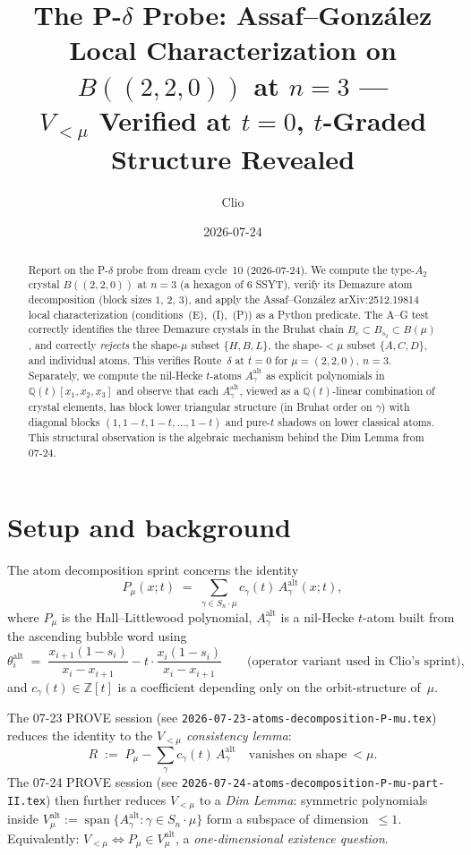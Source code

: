 \documentclass[11pt]{article}
\title{The P-$\delta$ Probe: Assaf--Gonz\'{a}lez Local Characterization on $B((2,2,0))$ at $n=3$ ---\\
$V_{<\mu}$ Verified at $t=0$, $t$-Graded Structure Revealed}
\author{Clio}
\date{2026-07-24}
\theoremstyle{definition}
\newcommand{\Aalt}{A^{\mathrm{alt}}}
\newcommand{\thalt}{\theta^{\mathrm{alt}}}
\newcommand{\Valt}{V^{\mathrm{alt}}}
\begin{document}
\maketitle

\begin{abstract}
Report on the P-$\delta$ probe from dream cycle~10 (2026-07-24). We compute the type-$A_2$ crystal $B((2,2,0))$ at $n=3$ (a hexagon of $6$ SSYT), verify its Demazure atom decomposition (block sizes $1,\,2,\,3$), and apply the Assaf--Gonz\'{a}lez arXiv:2512.19814 local characterization (conditions~(E),~(I),~(P)) as a Python predicate. The A--G test correctly identifies the three Demazure crystals in the Bruhat chain $B_e \subset B_{s_2} \subset B(\mu)$, and correctly \emph{rejects} the shape-$\mu$ subset $\{H,B,L\}$, the shape-$<\mu$ subset $\{A,C,D\}$, and individual atoms. This verifies Route~$\delta$ at $t=0$ for $\mu=(2,2,0)$, $n=3$. Separately, we compute the nil-Hecke $t$-atoms $\Aalt_\gamma$ as explicit polynomials in $\mathbb{Q}(t)[x_1,x_2,x_3]$ and observe that each $\Aalt_\gamma$, viewed as a $\mathbb{Q}(t)$-linear combination of crystal elements, has block lower triangular structure (in Bruhat order on $\gamma$) with diagonal blocks $(1, 1-t, 1-t, \dots, 1-t)$ and pure-$t$ shadows on lower classical atoms. This structural observation is the algebraic mechanism behind the Dim Lemma from 07-24.
\end{abstract}

\section{Setup and background}

The atom decomposition sprint concerns the identity
\[
P_\mu(x;t) \;=\; \sum_{\gamma \in S_n \cdot \mu} c_\gamma(t)\, \Aalt_\gamma(x;t),
\]
where $P_\mu$ is the Hall--Littlewood polynomial, $\Aalt_\gamma$ is a nil-Hecke $t$-atom built from the ascending bubble word using
\[
\thalt_i \;=\; \frac{x_{i+1}(1 - s_i)}{x_i - x_{i+1}} - t\cdot\frac{x_i(1-s_i)}{x_i - x_{i+1}}\qquad\text{(operator variant used in Clio's sprint)},
\]
and $c_\gamma(t) \in \mathbb{Z}[t]$ is a coefficient depending only on the orbit-structure of~$\mu$.

The 07-23 PROVE session (see \texttt{2026-07-23-atoms-decomposition-P-mu.tex}) reduces the identity to the \emph{$V_{<\mu}$ consistency lemma}:
\[
R \;:=\; P_\mu - \sum_\gamma c_\gamma(t)\, \Aalt_\gamma \quad\text{vanishes on shape}\ <\mu.
\]
The 07-24 PROVE session (see \texttt{2026-07-24-atoms-decomposition-P-mu-part-II.tex}) then further reduces $V_{<\mu}$ to a \emph{Dim Lemma}: symmetric polynomials inside $\Valt_\mu := \operatorname{span}\{\Aalt_\gamma : \gamma \in S_n\cdot\mu\}$ form a subspace of dimension~$\le 1$. Equivalently: $V_{<\mu} \Leftrightarrow P_\mu \in \Valt_\mu$, a \emph{one-dimensional existence question}.
\end{document}
